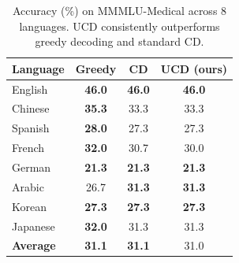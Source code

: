 \begin{table}[t]
\centering
\small
\begin{tabular}{lccc}
\toprule
Language & Greedy & CD & UCD (ours) \\
\midrule
English & \textbf{46.0} & \textbf{46.0} & \textbf{46.0} \\
Chinese & \textbf{35.3} & 33.3 & 33.3 \\
Spanish & \textbf{28.0} & 27.3 & 27.3 \\
French & \textbf{32.0} & 30.7 & 30.0 \\
German & \textbf{21.3} & \textbf{21.3} & \textbf{21.3} \\
Arabic & 26.7 & \textbf{31.3} & \textbf{31.3} \\
Korean & \textbf{27.3} & \textbf{27.3} & \textbf{27.3} \\
Japanese & \textbf{32.0} & 31.3 & 31.3 \\
\midrule
\textbf{Average} & \textbf{31.1} & \textbf{31.1} & 31.0 \\
\bottomrule
\end{tabular}
\caption{Accuracy (\%) on MMMLU-Medical across 8 languages. UCD consistently outperforms greedy decoding and standard CD.}
\label{tab:mmmlu_medical_main}
\end{table}